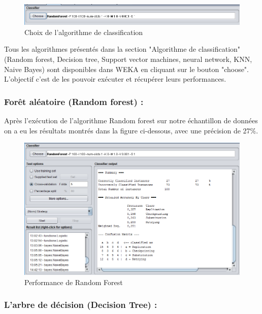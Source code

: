 \begin{figure}[H]
\begin{center}
\includegraphics[width=1\linewidth]{images/algorithme.PNG}
\end{center}
\caption{Choix de l'algorithme de classification}
\label{fig:17}
\end{figure}

Tous les algorithmes présentés dans la section "Algorithme de classification"  (Random forest, Decision tree, Support vector machines, neural network, KNN, Naive Bayes) sont disponibles dans WEKA en cliquant sur le bouton "choose". L'objectif c'est de les pouvoir exécuter et récupérer leurs performances.

\subsubsection{Forêt aléatoire (Random forest) :}

Après l'exécution de l'algorithme Random forest sur notre échantillon de données on a eu les résultats montrés dans la figure ci-dessous, avec une précision de 27\%.

\begin{figure}[H]
\begin{center}
\includegraphics[width=0.8\linewidth]{images/perfRF.PNG}
\end{center}
\caption{Performance de Random Forest}
\label{fig:166}
\end{figure}


\subsubsection{L'arbre de décision (Decision Tree) :}

